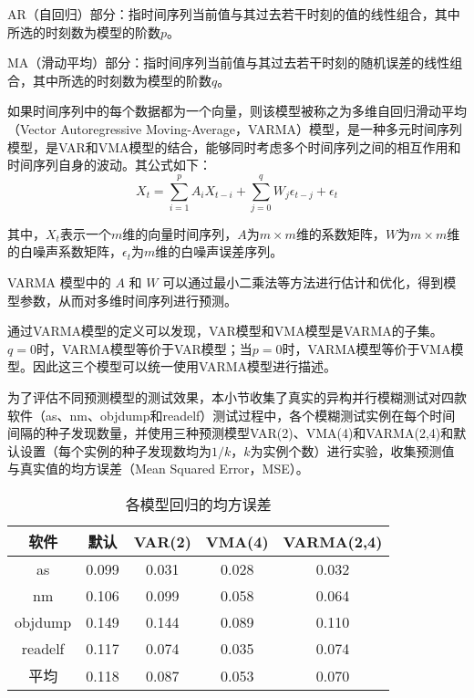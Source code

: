 \documentclass[master]{thesis-uestc}
\begin{document}
AR（自回归）部分：指时间序列当前值与其过去若干时刻的值的线性组合，其中所选的时刻数为模型的阶数$p$。

MA（滑动平均）部分：指时间序列当前值与其过去若干时刻的随机误差的线性组合，其中所选的时刻数为模型的阶数$q$。

如果时间序列中的每个数据都为一个向量，则该模型被称之为多维自回归滑动平均 （Vector Autoregressive Moving-Average，VARMA）模型，是一种多元时间序列模型，是VAR和VMA模型的结合，能够同时考虑多个时间序列之间的相互作用和时间序列自身的波动。其公式如下：
\begin{equation}
    X_t = \sum_{i=1}^{p}A_iX_{t-i} + \sum_{j=0}^{q}W_j\epsilon_{t-j}+\epsilon_t
\end{equation}

其中，$X_t$表示一个$m$维的向量时间序列，$A$为$m \times m$维的系数矩阵，$W$为$m \times m$维的白噪声系数矩阵，$\epsilon_t$为$m$维的白噪声误差序列。

VARMA 模型中的 $A$ 和 $W$ 可以通过最小二乘法等方法进行估计和优化，得到模型参数，从而对多维时间序列进行预测。

通过VARMA模型的定义可以发现，VAR模型和VMA模型是VARMA的子集。$q=0$时，VARMA模型等价于VAR模型；当$p=0$时，VARMA模型等价于VMA模型。因此这三个模型可以统一使用VARMA模型进行描述。

为了评估不同预测模型的测试效果，本小节收集了真实的异构并行模糊测试对四款软件（as、nm、objdump和readelf）测试过程中，各个模糊测试实例在每个时间间隔的种子发现数量，并使用三种预测模型VAR(2)、VMA(4)和VARMA(2,4)和默认设置（每个实例的种子发现数均为$1/k$，$k$为实例个数）进行实验，收集预测值与真实值的均方误差（Mean Squared Error，MSE）。

\begin{table}[!htbp]
    \caption{各模型回归的均方误差}
    \begin{tabular}{ccccc}
    \toprule
    软件 & 默认 & VAR(2) & VMA(4) & VARMA(2,4) \\
    \midrule
    as & 0.099 & 0.031 & 0.028 & 0.032 \\
    nm & 0.106 & 0.099 & 0.058 & 0.064 \\
    objdump & 0.149 & 0.144 & 0.089 & 0.110 \\
    readelf & 0.117 & 0.074 & 0.035 & 0.074 \\
    \hline
    平均 & 0.118 & 0.087 & 0.053 & 0.070 \\
    \bottomrule
    \end{tabular}
    \label{table_model}
    \vspace{6pt}
\end{table}
\end{document}
